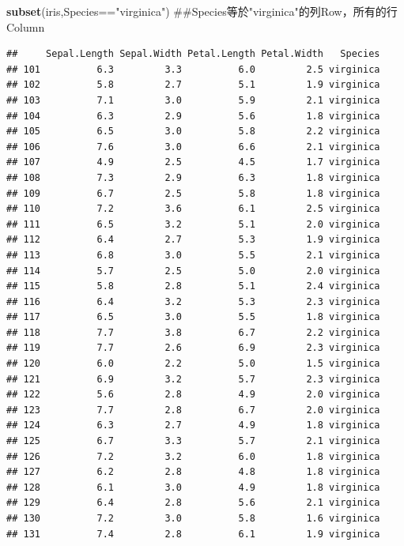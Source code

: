 \documentclass[]{book}
\newenvironment{Shaded}{\begin{snugshade}}{\end{snugshade}}
\newcommand{\KeywordTok}[1]{\textcolor[rgb]{0.13,0.29,0.53}{\textbf{{#1}}}}
\newcommand{\StringTok}[1]{\textcolor[rgb]{0.31,0.60,0.02}{{#1}}}
\newcommand{\NormalTok}[1]{{#1}}
\theoremstyle{definition}
\theoremstyle{definition}
\theoremstyle{remark}
\begin{document}
\begin{Shaded}
\begin{Highlighting}[]
\KeywordTok{subset}\NormalTok{(iris,Species==}\StringTok{"virginica"}\NormalTok{) ##Species等於"virginica"的列Row，所有的行Column}
\end{Highlighting}
\end{Shaded}

\begin{verbatim}
##     Sepal.Length Sepal.Width Petal.Length Petal.Width   Species
## 101          6.3         3.3          6.0         2.5 virginica
## 102          5.8         2.7          5.1         1.9 virginica
## 103          7.1         3.0          5.9         2.1 virginica
## 104          6.3         2.9          5.6         1.8 virginica
## 105          6.5         3.0          5.8         2.2 virginica
## 106          7.6         3.0          6.6         2.1 virginica
## 107          4.9         2.5          4.5         1.7 virginica
## 108          7.3         2.9          6.3         1.8 virginica
## 109          6.7         2.5          5.8         1.8 virginica
## 110          7.2         3.6          6.1         2.5 virginica
## 111          6.5         3.2          5.1         2.0 virginica
## 112          6.4         2.7          5.3         1.9 virginica
## 113          6.8         3.0          5.5         2.1 virginica
## 114          5.7         2.5          5.0         2.0 virginica
## 115          5.8         2.8          5.1         2.4 virginica
## 116          6.4         3.2          5.3         2.3 virginica
## 117          6.5         3.0          5.5         1.8 virginica
## 118          7.7         3.8          6.7         2.2 virginica
## 119          7.7         2.6          6.9         2.3 virginica
## 120          6.0         2.2          5.0         1.5 virginica
## 121          6.9         3.2          5.7         2.3 virginica
## 122          5.6         2.8          4.9         2.0 virginica
## 123          7.7         2.8          6.7         2.0 virginica
## 124          6.3         2.7          4.9         1.8 virginica
## 125          6.7         3.3          5.7         2.1 virginica
## 126          7.2         3.2          6.0         1.8 virginica
## 127          6.2         2.8          4.8         1.8 virginica
## 128          6.1         3.0          4.9         1.8 virginica
## 129          6.4         2.8          5.6         2.1 virginica
## 130          7.2         3.0          5.8         1.6 virginica
## 131          7.4         2.8          6.1         1.9 virginica

\end{verbatim}
\end{document}

